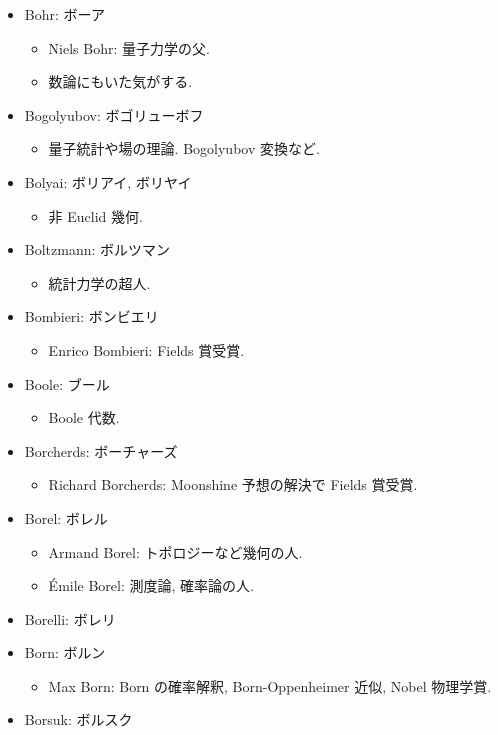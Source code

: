 \documentclass[openany, a4paper, oneside]{jsbook}
\begin{document}
\begin{itemize}
\begin{itemize}
\end{itemize}
\item Bohr: ボーア
\begin{itemize}
\item Niels Bohr: 量子力学の父.
\item 数論にもいた気がする.
\end{itemize}
\item Bogolyubov: ボゴリューボフ
\begin{itemize}
\item 量子統計や場の理論. Bogolyubov 変換など.
\end{itemize}
\item Bolyai: ボリアイ, ボリヤイ
\begin{itemize}
\item 非 Euclid 幾何.
\end{itemize}
\item Boltzmann: ボルツマン
\begin{itemize}
\item 統計力学の超人.
\end{itemize}
\item Bombieri: ボンビエリ
\begin{itemize}
\item Enrico Bombieri: Fields 賞受賞.
\end{itemize}
\item Boole: ブール
\begin{itemize}
\item Boole 代数.
\end{itemize}
\item Borcherds: ボーチャーズ
\begin{itemize}
\item Richard Borcherds: Moonshine 予想の解決で Fields 賞受賞.
\end{itemize}
\item Borel: ボレル
\begin{itemize}
\item Armand Borel: トポロジーなど幾何の人.
\item \'Emile Borel: 測度論, 確率論の人.
\end{itemize}
\item Borelli: ボレリ
\item Born: ボルン
\begin{itemize}
\item Max Born: Born の確率解釈, Born-Oppenheimer 近似, Nobel 物理学賞.
\end{itemize}
\item Borsuk: ボルスク

\end{itemize}
\end{document}
